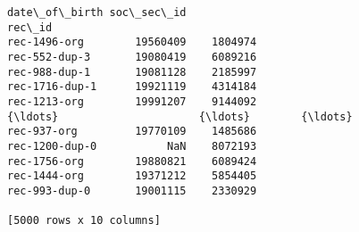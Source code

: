 \documentclass{article}
\begin{document}
\begin{Verbatim}[commandchars=\\\{\}]
               date\_of\_birth soc\_sec\_id  
rec\_id                                   
rec-1496-org        19560409    1804974  
rec-552-dup-3       19080419    6089216  
rec-988-dup-1       19081128    2185997  
rec-1716-dup-1      19921119    4314184  
rec-1213-org        19991207    9144092  
{\ldots}                      {\ldots}        {\ldots}  
rec-937-org         19770109    1485686  
rec-1200-dup-0           NaN    8072193  
rec-1756-org        19880821    6089424  
rec-1444-org        19371212    5854405  
rec-993-dup-0       19001115    2330929  

[5000 rows x 10 columns]
\end{Verbatim}
    \begin{Verbatim}[commandchars=\\\{\}]

\end{Verbatim}
\begin{Verbatim}[commandchars=\\\{\}]

\end{Verbatim}
    \begin{Verbatim}[commandchars=\\\{\}]

\end{Verbatim}
\begin{Verbatim}[commandchars=\\\{\}]

\end{Verbatim}
    \begin{Verbatim}[commandchars=\\\{\}]

\end{Verbatim}
\begin{Verbatim}[commandchars=\\\{\}]

\end{Verbatim}
    \begin{Verbatim}[commandchars=\\\{\}]

\end{Verbatim}
\begin{Verbatim}[commandchars=\\\{\}]

\end{Verbatim}
    \begin{Verbatim}[commandchars=\\\{\}]

\end{Verbatim}
\end{document}
